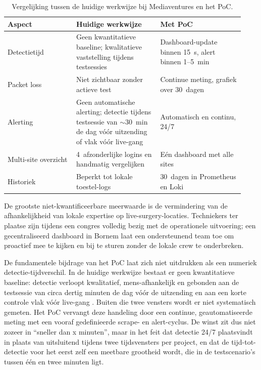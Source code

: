 \begin{table}[H]
  \centering
  \caption[Vergelijking met de huidige werkwijze]{Vergelijking tussen de huidige werkwijze bij Mediaventures en het PoC.}
  \label{tab:poc-vergelijking}
  \begin{tabular}{p{0.27\linewidth} p{0.33\linewidth} p{0.33\linewidth}}
    \hline
    \textbf{Aspect} & \textbf{Huidige werkwijze} & \textbf{Met PoC} \\
    \hline
    Detectietijd         & Geen kwantitatieve baseline; kwalitatieve vaststelling tijdens testsessies & Dashboard-update binnen 15~s, alert binnen 1--5~min \\
    Packet loss          & Niet zichtbaar zonder actieve test & Continue meting, grafiek over 30~dagen \\
    Alerting             & Geen automatische alerting; detectie tijdens testsessie van $\sim$30~min de dag vóór uitzending of vlak vóór live-gang & Automatisch en continu, 24/7 \\
    Multi-site overzicht & 4~afzonderlijke logins en handmatig vergelijken & Eén dashboard met alle sites \\
    Historiek            & Beperkt tot lokale toestel-logs & 30~dagen in Prometheus en Loki \\
    \hline
  \end{tabular}
\end{table}

De grootste niet-kwantificeerbare meerwaarde is de vermindering van de afhankelijkheid van lokale expertise op live-surgery-locaties. Techniekers ter plaatse zijn tijdens een congres volledig bezig met de operationele uitvoering; een gecentraliseerd dashboard in Bornem laat een ondersteunend team toe om proactief mee te kijken en bij te sturen zonder de lokale crew te onderbreken.

De fundamentele bijdrage van het PoC laat zich niet uitdrukken als een numeriek detectie-tijdverschil. In de huidige werkwijze bestaat er geen kwantitatieve baseline: detectie verloopt kwalitatief, mens-afhankelijk en gebonden aan de testsessie van circa dertig minuten de dag vóór de uitzending en aan een korte controle vlak vóór live-gang \autocite{VanRenterghem2025}. Buiten die twee vensters wordt er niet systematisch gemeten. Het PoC vervangt deze handeling door een continue, geautomatiseerde meting met een vooraf gedefinieerde scrape- en alert-cyclus. De winst zit dus niet zozeer in ``sneller dan x minuten'', maar in het feit dat detectie 24/7 plaatsvindt in plaats van uitsluitend tijdens twee tijdsvensters per project, en dat de tijd-tot-detectie voor het eerst zelf een meetbare grootheid wordt, die in de testscenario's tussen één en twee minuten ligt.


